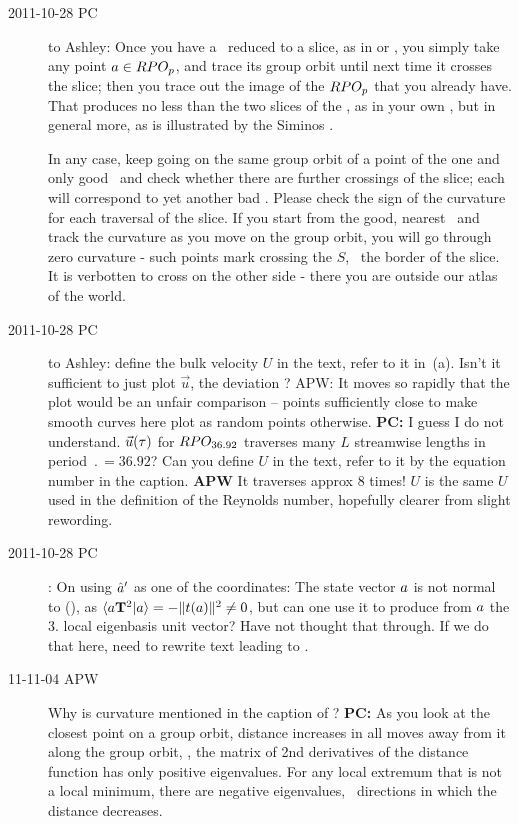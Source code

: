 \begin{description}
\medskip


\item[2011-10-28 PC~~] to Ashley: Once you have a \rpo\ reduced to a
slice, as in  or , you
simply take any point $a \in RPO_{p}$, and trace its group orbit until
next time it crosses the slice; then you trace out the image of the
$RPO_{p}$ that you already have. That produces no less than the two slices of
the \rpo, as in your own , but in general more, as is
illustrated by the Siminos .

In any case, keep going on the same group orbit of a point of the one and
only good \po\ and check whether there are further crossings of the
slice; each will correspond to yet another bad \po. Please check the sign
of the curvature for each traversal of the slice. If you
start from the good, nearest \po\ and track the curvature as you move on
the group orbit, you will go through zero curvature - such points mark
crossing the {\chartBord} $S$, \ie\ the border of the slice. It is verbotten
to cross on the other side - there you are outside our atlas of the
world.

\item[2011-10-28 PC~~] to Ashley:
    define the bulk velocity $U$ in the text, refer to it in
    \,{(a)}. Isn't it sufficient to just plot
    $\vec{u}$, the deviation ? APW: It moves so
    rapidly that the plot would be an unfair comparison -- points
    sufficiently close to make smooth curves here plot as random points
    otherwise.  {\bf PC:}  I guess I do not understand. $\vec{u}(\tau)$
    for $RPO_{36.92}$ traverses many $L$ streamwise lengths in period
    $\period{}=36.92$? Can you define $U$ in the text, refer to it by the
    equation number in the caption.
    {\bf APW} It traverses approx 8 times!  $U$ is the same $U$ used
    in the definition of the Reynolds number, hopefully clearer from
    slight rewording.

\item[2011-10-28 PC~~]: On using $\hat{a}'$ as one of the coordinates: The
state vector $a$ is not normal to \normVec(\ssp), as $\braket{\ssp
\Lg^2}{\ssp} = - \Norm{\groupTan(\ssp)}^2 \neq 0$, but can one use it to
produce from $a$ the 3. local eigenbasis unit vector? Have not thought
that through. If we do that here, need to rewrite text leading to
.

\item[11-11-04 APW~~] Why is curvature mentioned in the caption of
? {\bf PC:} As you look at the closest point on a
group orbit, distance increases in all moves away from it along the group
orbit, \ie, the matrix of 2nd derivatives of the distance function has
only positive eigenvalues. For any local extremum that is not a local
minimum, there are negative eigenvalues, \ie\ directions in which the
distance decreases.


\end{description}
